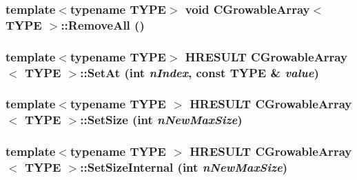 \label{class_c_growable_array_ad8d75650829296f666f9c1f099f505a4}
\hypertarget{class_c_growable_array_a1ab980cfe0dd1733f1bce0d7a2880e2d}{
\subsubsection[{RemoveAll}]{\setlength{\rightskip}{0pt plus 5cm}template$<$typename TYPE$>$ void {\bf CGrowableArray}$<$ TYPE $>$::RemoveAll ()}}
\label{class_c_growable_array_a1ab980cfe0dd1733f1bce0d7a2880e2d}
\hypertarget{class_c_growable_array_ac8768c8a2f9183af4f3f24d98f4818e1}{
\subsubsection[{SetAt}]{\setlength{\rightskip}{0pt plus 5cm}template$<$typename TYPE$>$ HRESULT {\bf CGrowableArray}$<$ TYPE $>$::SetAt ({\bf int} {\em nIndex}, \/  const TYPE \& {\em value})}}
\label{class_c_growable_array_ac8768c8a2f9183af4f3f24d98f4818e1}
\hypertarget{class_c_growable_array_a4a4ebbbb825519349a1cb07a8002975a}{
\subsubsection[{SetSize}]{\setlength{\rightskip}{0pt plus 5cm}template$<$typename TYPE $>$ HRESULT {\bf CGrowableArray}$<$ TYPE $>$::SetSize ({\bf int} {\em nNewMaxSize})}}
\label{class_c_growable_array_a4a4ebbbb825519349a1cb07a8002975a}
\hypertarget{class_c_growable_array_a038c8e7e9d43bdbc27c4260ffbf00f10}{
\subsubsection[{SetSizeInternal}]{\setlength{\rightskip}{0pt plus 5cm}template$<$typename TYPE $>$ HRESULT {\bf CGrowableArray}$<$ TYPE $>$::SetSizeInternal ({\bf int} {\em nNewMaxSize})}}
\label{class_c_growable_array_a038c8e7e9d43bdbc27c4260ffbf00f10}


